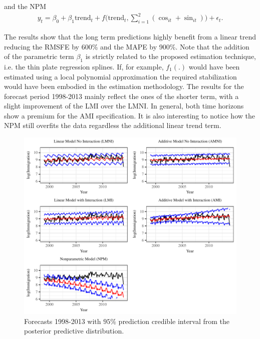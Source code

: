 \documentclass{article}\usepackage[]{graphicx}\usepackage[]{color}
\begin{document}
and the NPM
\begin{align}\label{fourier_non_par_long}
y_{t} = \beta_{0} + \beta_{1}\text{trend}_{t} + f\bigg(\text{trend}_t, \sum_{i=1}^{2} (\cos_{it} + \sin_{it}) \bigg) + \epsilon_{t}.
\end{align}

The results show that the long term predictions highly benefit from a linear trend reducing the RMSFE by 600\% and the MAPE by 900\%. Note that the addition of the parametric term $ \beta_{1} $ is strictly related to the proposed estimation technique, i.e. the thin plate regression splines. If, for example, $ f_{1}(.) $ would have been estimated using a local polynomial approximation the required stabilization would have been embodied in the estimation methodology. 
The results for the forecast period 1998-2013 mainly reflect the ones of the shorter term, with a slight improvement of the LMI over the LMNI. In general, both time horizons show a premium for the AMI specification. It is also interesting to notice how the NPM still overfits the data regardless the additional linear trend term.

\begin{figure}[H]
\centering
\includegraphics[scale=1]{Long_run_rsults.pdf}
\caption{Forecasts 1998-2013 with $95\%$ prediction credible interval from the posterior predictive distribution.}
\label{fig:prediction new horizons}
\end{figure}
\end{document}
